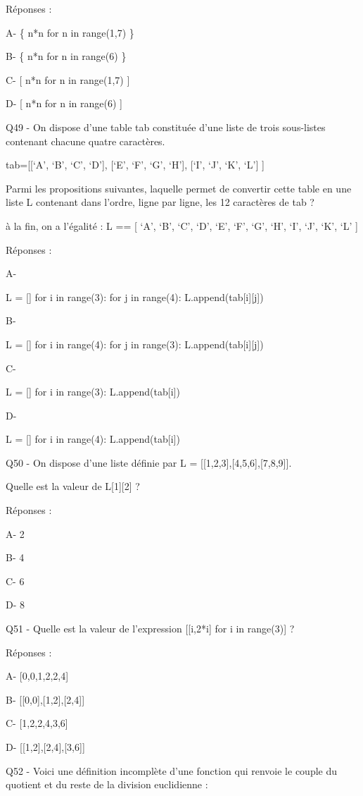 \documentclass[
]{book}
\begin{document}
Réponses :

A- \{ n*n for n in range(1,7) \}

B- \{ n*n for n in range(6) \}

C- {[} n*n for n in range(1,7) {]}

D- {[} n*n for n in range(6) {]}

Q49 - On dispose d'une table tab constituée d'une liste de trois sous-listes contenant chacune quatre caractères.

tab={[}{[}`A', `B', `C', `D'{]},
{[}`E', `F', `G', `H'{]},
{[}`I', `J', `K', `L'{]} {]}

Parmi les propositions suivantes, laquelle permet de convertir cette table en une liste L contenant dans l'ordre, ligne par ligne, les 12 caractères de tab ?

à la fin, on a l'égalité :
L == {[} `A', `B', `C', `D', `E', `F', `G', `H', `I', `J', `K', `L' {]}

Réponses :

A-

L = {[}{]}
for i in range(3):
for j in range(4):
L.append(tab{[}i{]}{[}j{]})

B-

L = {[}{]}
for i in range(4):
for j in range(3):
L.append(tab{[}i{]}{[}j{]})

C-

L = {[}{]}
for i in range(3):
L.append(tab{[}i{]})

D-

L = {[}{]}
for i in range(4):
L.append(tab{[}i{]})

Q50 - On dispose d'une liste définie par L = {[}{[}1,2,3{]},{[}4,5,6{]},{[}7,8,9{]}{]}.

Quelle est la valeur de L{[}1{]}{[}2{]} ?

Réponses :

A- 2

B- 4

C- 6

D- 8

Q51 - Quelle est la valeur de l'expression {[}{[}i,2*i{]} for i in range(3){]} ?

Réponses :

A- {[}0,0,1,2,2,4{]}

B- {[}{[}0,0{]},{[}1,2{]},{[}2,4{]}{]}

C- {[}1,2,2,4,3,6{]}

D- {[}{[}1,2{]},{[}2,4{]},{[}3,6{]}{]}

Q52 - Voici une définition incomplète d'une fonction qui renvoie le couple du quotient et du reste de la division euclidienne :
\end{document}
